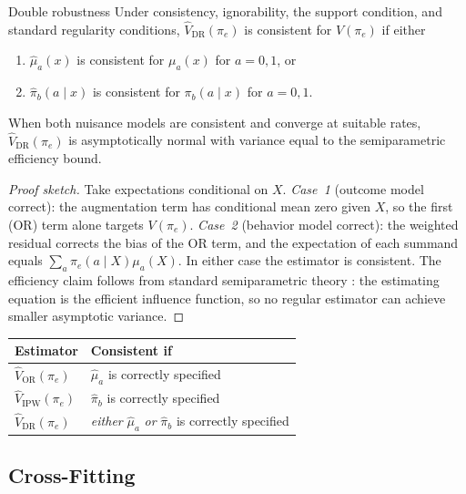 \documentclass[master.tex]{subfiles}
\begin{document}
\begin{thm}{Double robustness}
\label{w13:thm:dr}
Under consistency, ignorability, the support condition, and standard regularity conditions, $\hat V_{\mathrm{DR}}(\pi_e)$ is consistent for $V(\pi_e)$ if either
\begin{enumerate}
    \item $\hat\mu_a(x)$ is consistent for $\mu_a(x)$ for $a=0,1$, or
    \item $\hat\pi_b(a\mid x)$ is consistent for $\pi_b(a\mid x)$ for $a=0,1$.
\end{enumerate}
When both nuisance models are consistent and converge at suitable rates, $\hat V_{\mathrm{DR}}(\pi_e)$ is asymptotically normal with variance equal to the semiparametric efficiency bound.
\end{thm}

\begin{proof}[Proof sketch]
Take expectations conditional on $X$.
\textit{Case~1} (outcome model correct): the augmentation term has conditional mean zero given $X$, so the first (OR) term alone targets $V(\pi_e)$.
\textit{Case~2} (behavior model correct): the weighted residual corrects the bias of the OR term, and the expectation of each summand equals $\sum_a\pi_e(a\mid X)\mu_a(X)$.
In either case the estimator is consistent.  The efficiency claim follows from standard semiparametric theory \citep{tsiatis2006semiparametric}: the estimating equation is the efficient influence function, so no regular estimator can achieve smaller asymptotic variance.
\end{proof}

\begin{tcolorbox}[defstyle, title={Summary: Consistency requirements for the three estimators}]
\renewcommand{\arraystretch}{1.2}
\begin{tabular}{ll}
\hline
\textbf{Estimator} & \textbf{Consistent if} \\
\hline
$\hat V_{\mathrm{OR}}(\pi_e)$ & $\hat\mu_a$ is correctly specified \\
$\hat V_{\mathrm{IPW}}(\pi_e)$ & $\hat\pi_b$ is correctly specified \\
$\hat V_{\mathrm{DR}}(\pi_e)$ & \textit{either} $\hat\mu_a$ \textit{or} $\hat\pi_b$ is correctly specified \\
\hline
\end{tabular}
\end{tcolorbox}

\subsection{Cross-Fitting}
\label{w13:subsec:crossfit}
\end{document}
